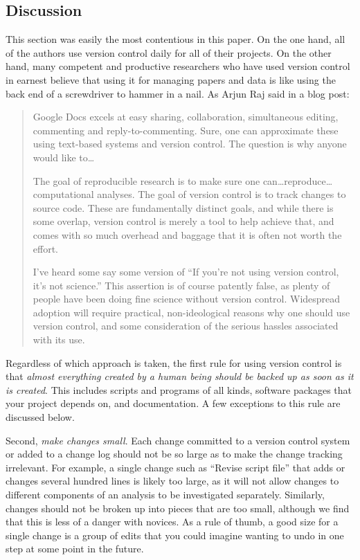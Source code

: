 \documentclass[10pt]{article}
\newcommand{\recommend}[1]{\textit{#1}}
\begin{document}
\subsection*{Discussion}

This section was easily the most contentious in this paper.  On the
one hand, all of the authors use version control daily for all of
their projects.  On the other hand, many competent and productive
researchers who have used version control in earnest believe that
using it for managing papers and data is like using the back end of a
screwdriver to hammer in a nail.  As Arjun Raj said in a blog post:

\begin{quote}
Google Docs excels at easy sharing, collaboration, simultaneous
editing, commenting and reply-to-commenting. Sure, one can approximate
these using text-based systems and version control. The question is
why anyone would like to{\ldots}

The goal of reproducible research is to make sure one
can{\dots}reproduce{\ldots}computational analyses. The goal of version
control is to track changes to source code. These are fundamentally
distinct goals, and while there is some overlap, version control is
merely a tool to help achieve that, and comes with so much overhead
and baggage that it is often not worth the effort.

I've heard some say some version of ``If you're not using version
control, it's not science.'' This assertion is of course patently
false, as plenty of people have been doing fine science without
version control. Widespread adoption will require practical,
non-ideological reasons why one should use version control, and some
consideration of the serious hassles associated with its use.
\end{quote}

Regardless of which approach is taken, the first rule for using
version control is that \recommend{almost everything created by a
  human being should be backed up as soon as it is created}. This
includes scripts and programs of all kinds, software packages that
your project depends on, and documentation. A few exceptions to this
rule are discussed below.

Second, \recommend{make changes small}.  Each change committed to a
version control system or added to a change log should not be so large
as to make the change tracking irrelevant. For example, a single
change such as ``Revise script file'' that adds or changes several
hundred lines is likely too large, as it will not allow changes to
different components of an analysis to be investigated
separately. Similarly, changes should not be broken up into pieces
that are too small, although we find that this is less of a danger
with novices. As a rule of thumb, a good size for a single change is a
group of edits that you could imagine wanting to undo in one step at
some point in the future.
\end{document}

